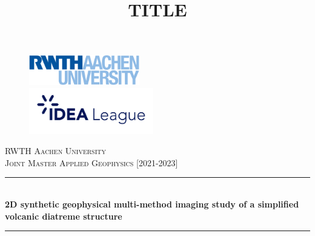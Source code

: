 \documentclass[11pt]{article}%
\title{TITLE}
\begin{document}
\begin{titlepage}


\begin{figure}[!tbp]
  \centering
  \begin{minipage}[b]{0.4\textwidth}
  \begin{flushleft}
    \includegraphics[height=1.3cm]{Titlepage_files/RWTH_Logo.png}
  \end{flushleft}
  \end{minipage}
  \hfill
  \begin{minipage}[b]{0.4\textwidth}
  \begin{flushright}
    \includegraphics[height=2cm]{Titlepage_files/IDEA_Leage_logo.png}
  \end{flushright}
  \end{minipage}
\end{figure}


\begin{center}
\newcommand{\HRule}{\rule{\linewidth}{0.5mm}} %
\textsc{\LARGE RWTH Aachen University}\\[1.5cm]

\textsc{\Large Joint Master Applied Geophysics [2021-2023]}\\[1.5cm]

\HRule \\[0.5cm]
{ \huge \bfseries 2D synthetic geophysical multi-method imaging study of a simplified volcanic diatreme structure}\\[0.5cm]
\HRule \\[1.5cm]
\Large


\end{center}
\end{titlepage}
\end{document}
